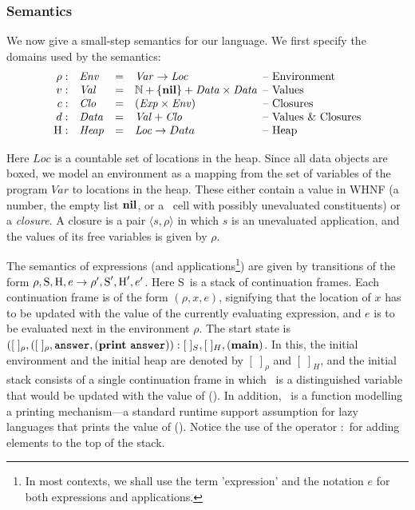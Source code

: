 \documentclass[9pt]{sigplanconf}
\newcommand{\stk}{\mbox{S}}       %
\begin{document}
\subsubsection{Semantics}
We now give  a small-step semantics for our  language.
We first specify the domains used by the semantics:
\[
\begin{array}{rlcl@{\hspace{0.5em}}l}
\rho: & \mathit{Env} &=&\mathit{Var} \rightarrow \mathit{Loc} &
\mbox{-- Environment} \\
v:   & \mathit{Val} &=& \mathbb{N} + \{\NIL\} + \mathit{Data \times
  Data}& \mbox{-- Values}\\
c:   & \mathit{Clo} &=& \mathit{(Exp \times Env)}& \mbox{--
  Closures}\\
d: & \mathit{Data} &=&\mathit{Val} + \mathit{Clo} & \mbox{-- Values \&
  Closures} \\
\heap: & \mathit{Heap} & =&\mathit{Loc} \rightarrow Data & \mbox{--
Heap}
\end{array}
\] 

Here  $\mathit{Loc}$ is  a countable  set  of locations  in the  heap.
Since all data objects are boxed, we model an environment as a mapping
from the set  of variables of the program  $\mathit{Var}$ to locations
in the  heap.  These  either contain  a value in  WHNF (a  number, the
empty  list  $\mbox{$\mathbf{ nil}$}$,  or  a  \CONS\  cell  with  possibly  unevaluated
constituents) or  a {\em  closure}.  A closure  is a pair  $\langle s,
\rho\rangle$  in which  $s$  is an  unevaluated  application, and  the
values of its free variables is given by $\rho$.

The  semantics  of   expressions  (and  applications\footnote{In  most
  contexts, we  shall use  the term 'expression' and the notation $e$  for both  expressions and
  applications.}) are  given by transitions  of the form  $\rho, \stk,
\heap, e \rightarrow \rho', \stk', \heap', e'$.  Here \stk\ is a stack
of  continuation  frames.  Each  continuation  frame  is  of the  form
$(\rho, x, e)$, signifying that the  location of $x$ has to be updated
with the  value of the currently  evaluating expression, and $e$  is to be
evaluated  next  in  the  environment  $\rho$.   The  start  state  is
$([\;]_\rho,([\;]_\rho,  \mathbf{\mbox{\tt answer}},   (\mathbf{print}~\mathbf{\mbox{\tt answer}})):[\;]_{S}  ,  [\;]_{H},
(\mathbf{main})$.  In  this, the initial  environment and the  initial heap
are  denoted  by  $[\;]_\rho$  and  $[\;]_H$, and  the  initial  stack
consists  of  a  single  continuation   frame  in  which  \ans\  is  a
distinguished  variable  that  would  be  updated with  the  value  of
(\mainpgm).  In  addition, \print\ is a function  modelling a printing
mechanism---a standard  runtime support assumption  for lazy languages
that prints the  value of (\mainpgm).  Notice the  use of the operator
$:$ for adding elements to the top of the stack.
\end{document}

